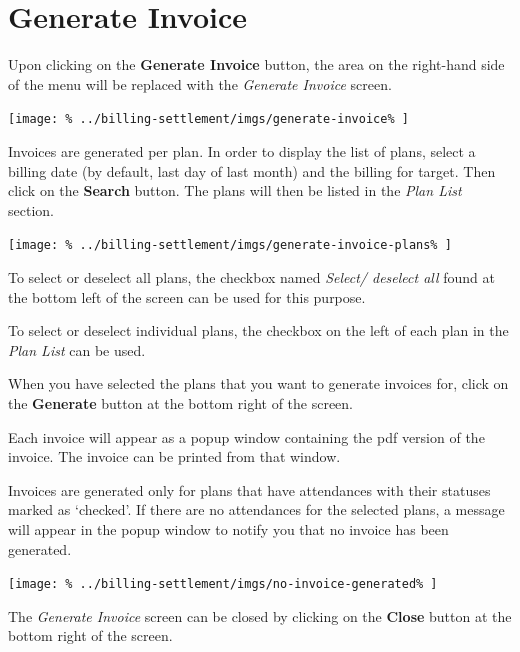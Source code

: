 \documentclass[../main/main]{subfiles}
\begin{document}
\newpage
\section{Generate Invoice}
\label{sec:generate-invoice}

Upon clicking on the \textbf{Generate Invoice} button,
the area on the right-hand side of the menu will be replaced with the
\emph{Generate Invoice} screen.

\texttt{[image: \%
  ../billing-settlement/imgs/generate-invoice\%
]}

Invoices are generated per plan. In order to display the list of plans,
select a billing date (by default, last day of last month) and the billing
for target. Then click on the \textbf{Search} button. The plans will then be
listed in the \emph{Plan List} section.

\texttt{[image: \%
  ../billing-settlement/imgs/generate-invoice-plans\%
]}

To select or deselect all plans, the checkbox named \emph{Select/ deselect all}
found at the bottom left of the screen can be used for this purpose.

To select or deselect individual plans, the checkbox on the left of each plan in
the \emph{Plan List} can be used.

When you have selected the plans that you want to generate invoices for,
click on the \textbf{Generate} button at the bottom right of the screen.

Each invoice will appear as a popup window containing the pdf version of
the invoice. The invoice can be printed from that window.

Invoices are generated only for plans that have attendances with their statuses
marked as `checked'. If there are no attendances for the selected plans, a
message will appear in the popup window to notify you that no invoice has been
generated.

\texttt{[image: \%
  ../billing-settlement/imgs/no-invoice-generated\%
]}

The \emph{Generate Invoice} screen can be closed by clicking on the
\textbf{Close} button at the bottom right of the screen.
\end{document}
